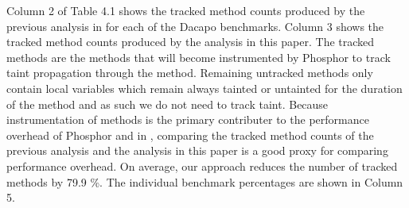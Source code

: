 \begin{center}
\end{center}

Column 2 of Table 4.1 shows the tracked method counts produced by the
previous analysis in \cite{manoj_project} for each of the Dacapo
benchmarks. Column 3 shows the tracked method counts produced by the
analysis in this paper. The tracked methods are the methods that will
become instrumented by Phosphor to track taint propagation through the
method. Remaining untracked methods only contain local variables which
remain always tainted or untainted for the duration of the method and
as such we do not need to track taint. Because instrumentation of
methods is the primary contributer to the performance overhead of
Phosphor and in \cite{manoj_phosphor}, comparing the tracked method
counts of the previous analysis and the analysis in this paper is a
good proxy for comparing performance overhead. On average, our
approach reduces the number of tracked methods by 79.9 \%. The
individual benchmark percentages are shown in Column 5.

